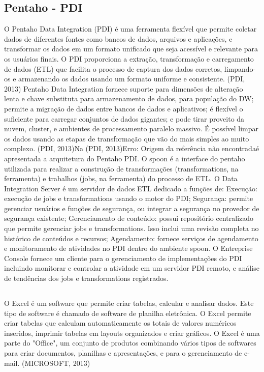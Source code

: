 \subsection{Pentaho - PDI}
O Pentaho Data Integration (PDI) é uma ferramenta flexível que permite coletar dados de diferentes fontes como bancos de dados, arquivos e aplicações, e transformar os dados em um formato unificado que seja acessível e relevante para os usuários finais. O PDI proporciona a extração, transformação e carregamento de dados (ETL) que facilita o processo de captura dos dados corretos, limpando-os e armazenando os dados usando um formato uniforme e consistente. (PDI, 2013)
Pentaho Data Integration fornece suporte para dimensões de alteração lenta e chave substituta para armazenamento de dados, para população do DW; permite a migração de dados entre bancos de dados e aplicativos; é flexível o suficiente para carregar conjuntos de dados gigantes; e pode tirar proveito da nuvem, cluster, e ambientes de processamento paralelo massivo. É possível limpar os dados usando as etapas de transformação que vão do mais simples ao muito complexo. (PDI, 2013)Na (PDI, 2013)Erro: Origem da referência não encontradaé apresentada a arquitetura do Pentaho PDI. 
O spoon é a interface do pentaho utilizada para realizar a construção de transformações (transformations, na ferramenta) e trabalhos (jobs, na ferramenta) do processo de ETL. O Data Integration Server é um servidor de dados ETL dedicado a funções de:
Execução: execução de jobs e transformations usando o motor do PDI;
Segurança: permite gerenciar usuários e funções de segurança, ou integrar a segurança no provedor de segurança existente;
Gerenciamento de conteúdo: possui repositório centralizado que permite gerenciar jobs e transformations. Isso inclui uma revisão completa no histórico de conteúdos e recursos;
Agendamento: fornece serviços de agendamento e monitoramento de atividades no PDI dentro do ambiente spoon. O Entreprise Console fornece um cliente para o gerenciamento de implementações do PDI incluindo monitorar e controlar a atividade em um servidor PDI remoto, e análise de tendências dos jobs e transformations registrados.

\subsection{}
O Excel é um software que permite criar tabelas, calcular e analisar dados. Este tipo de software é chamado de software de planilha eletrônica. O Excel permite criar tabelas que calculam automaticamente os totais de valores numéricos inseridos, imprimir tabelas em layouts organizados e criar gráficos. O Excel é uma parte do "Office", um conjunto de produtos combinando vários tipos de softwares para criar documentos, planilhas e apresentações, e para o gerenciamento de e-mail. (MICROSOFT, 2013)

